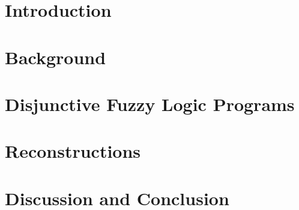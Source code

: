\section{Introduction}


\section{Background}




\section{Disjunctive Fuzzy Logic Programs}


\section{Reconstructions}




\section{Discussion and Conclusion}

